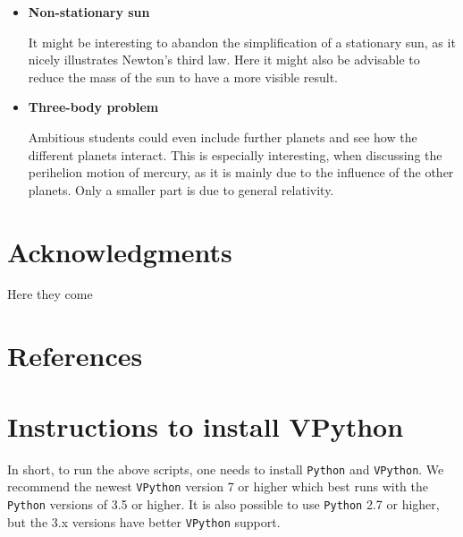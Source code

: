 \documentclass[12pt,ngerman,american]{iopart}
\newcommand{\python}[0]{\texttt{Python}}
\newcommand{\vpython}[0]{\texttt{VPython}}
\begin{document}
\begin{itemize}
\begin{itemize}
\item \textbf{Non-stationary sun}

It might be interesting to abandon the simplification of a stationary sun, as it nicely illustrates Newton's third law.
Here it might also be advisable to reduce the mass of the sun to have a more visible result.

\item \textbf{Three-body problem}

Ambitious students could even include further planets and see how the different planets interact.
This is especially interesting, when discussing the perihelion motion of mercury, as it is mainly due to the influence of the other planets.
Only a smaller part is due to general relativity.

\end{itemize}

\end{itemize}

\appendix

\section*{Acknowledgments}
Here they come

\section*{References}



\section{Instructions to install VPython}\label{appendix:python}
In short, to run the above scripts, one needs to install \python{} and \vpython{}.
We recommend the newest \vpython{} version 7 or higher which best runs with the \python{} versions of 3.5 or higher.
It is also possible to use \python{} 2.7 or higher, but the 3.x versions have better \vpython{} support.
\end{document}
